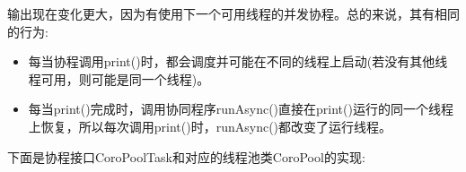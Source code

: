 输出现在变化更大，因为有使用下一个可用线程的并发协程。总的来说，其有相同的行为:

\begin{itemize}
\item 
每当协程调用print()时，都会调度并可能在不同的线程上启动(若没有其他线程可用，则可能是同一个线程)。

\item 
每当print()完成时，调用协同程序runAsync()直接在print()运行的同一个线程上恢复，所以每次调用print()时，runAsync()都改变了运行线程。
\end{itemize}


下面是协程接口CoroPoolTask和对应的线程池类CoroPool的实现:


